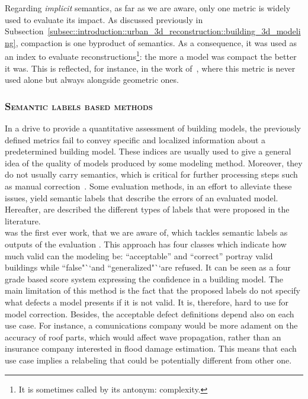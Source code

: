             Regarding \textit{implicit} semantics, as far as we are aware, only one metric is widely used to evaluate its impact.
            As discussed previously in Subsection~\ref{subsec::introduction::urban_3d_reconstruction::building_3d_modeling}, compaction is one byproduct of semantics.
            As a consequence, it was used as an index to evaluate reconstructions\footnote{It is sometimes called by its antonym: complexity.}: the more a model was compact the better it was.
            This is reflected, for instance, in the work of~\textcite{lafarge2012creating,duan_eccv16,zhang2017deep,zeng2018neural,zhu2018large}, where this metric is never used alone but always alongside geometric ones.

        \subsubsection{\textsc{Semantic labels based methods}}
            \label{subsec::state_of_the_art::quality::output::semantic}
            In a drive to provide a quantitative assessment of building models, the previously defined metrics fail to convey specific and localized information about a predetermined building model.
            These indices are usually used to give a general idea of the quality of models produced by some modeling method.
            Moreover, they do not usually carry semantics, which is critical for further processing steps such as manual correction~\parencite{elberink2011quality}.
            Some evaluation methods, in an effort to alleviate these issues, yield semantic labels that describe the errors of an evaluated model.
            Hereafter, are described the different types of labels that were proposed in the literature.\\

            \parencite{boudet2006supervised} was the first ever work, that we are aware of, which tackles semantic labels as outputs of the evaluation .
            This approach has four classes which indicate how much valid can the modeling be: ``acceptable'' and ``correct'' portray valid buildings while ``false"``and ``generalized"``are refused.
            It can be seen as a four grade based score system expressing the confidence in a building model.
            The main limitation of this method is the fact that the proposed labels do not specify what defects a model presents if it is not valid.
            It is, therefore, hard to use for model correction.
            Besides, the acceptable defect definitions depend also on each use case.
            For instance, a comunications company would be more adament on the accuracy of roof parts, which would affect wave propagation, rather than an insurance company interested in flood damage estimation.
            This means that each use case implies a relabeling that could be potentially different from other one.\\
            
